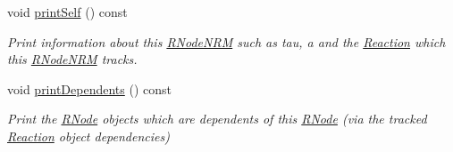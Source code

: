 \begin{DoxyCompactItemize}
void \hyperlink{classchem_1_1RNodeNRM_a1855b936b240d7764907434421258c5a}{print\-Self} () const 
\begin{DoxyCompactList}\small\item\em Print information about this \hyperlink{classchem_1_1RNodeNRM}{R\-Node\-N\-R\-M} such as tau, a and the \hyperlink{classchem_1_1Reaction}{Reaction} which this \hyperlink{classchem_1_1RNodeNRM}{R\-Node\-N\-R\-M} tracks. \end{DoxyCompactList}\item 
void \hyperlink{classchem_1_1RNodeNRM_ad8e5f9557c3ba701596aff928dc5270e}{print\-Dependents} () const 
\begin{DoxyCompactList}\small\item\em Print the \hyperlink{classchem_1_1RNode}{R\-Node} objects which are dependents of this \hyperlink{classchem_1_1RNode}{R\-Node} (via the tracked \hyperlink{classchem_1_1Reaction}{Reaction} object dependencies) \end{DoxyCompactList}\end{DoxyCompactItemize}
